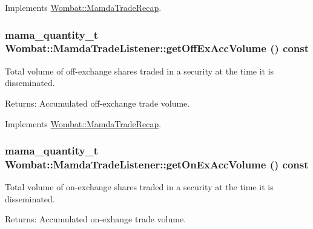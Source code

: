 Implements \hyperlink{classWombat_1_1MamdaTradeRecap_1e7f8f77a649030465d7a4ccfa1baef0}{Wombat::Mamda\-Trade\-Recap}.\hypertarget{classWombat_1_1MamdaTradeListener_e4a1bd8bfd6143e85e08ebd98fa8b8c1}{
\subsubsection[getOffExAccVolume]{\setlength{\rightskip}{0pt plus 5cm}mama\_\-quantity\_\-t Wombat::Mamda\-Trade\-Listener::get\-Off\-Ex\-Acc\-Volume () const}}
\label{classWombat_1_1MamdaTradeListener_e4a1bd8bfd6143e85e08ebd98fa8b8c1}


Total volume of off-exchange shares traded in a security at the time it is disseminated. 

\begin{Desc}
\item[Returns:]Accumulated off-exchange trade volume. \end{Desc}


Implements \hyperlink{classWombat_1_1MamdaTradeRecap_5df4b8f6c1238676d1c50fb8d50ed2df}{Wombat::Mamda\-Trade\-Recap}.\hypertarget{classWombat_1_1MamdaTradeListener_5de3d861733f64d1a4b941c32cd1bb4b}{
\subsubsection[getOnExAccVolume]{\setlength{\rightskip}{0pt plus 5cm}mama\_\-quantity\_\-t Wombat::Mamda\-Trade\-Listener::get\-On\-Ex\-Acc\-Volume () const}}
\label{classWombat_1_1MamdaTradeListener_5de3d861733f64d1a4b941c32cd1bb4b}


Total volume of on-exchange shares traded in a security at the time it is disseminated. 

\begin{Desc}
\item[Returns:]Accumulated on-exhange trade volume. \end{Desc}


